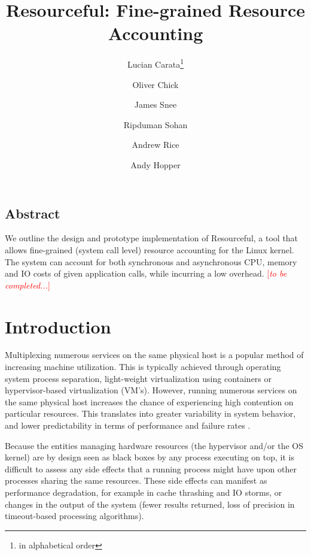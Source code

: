 \documentclass[letterpaper,twocolumn,10pt]{article}
\newcommand{\pname}{Resourceful}
\newcommand{\lnote}[1]{\textcolor{red}{[\textit{#1}]}} %
\newcommand*\aorder[1][\value{footnote}]{\footnotemark[#1]}
\begin{document}
\date{}

\title{\Large \bf \pname: Fine-grained Resource Accounting}

\author{Lucian Carata\thanks{in alphabetical order}\aorder} \author{Oliver
Chick\aorder} \author{James Snee\aorder} \author{\authorcr{}Ripduman Sohan}
\author{Andrew Rice} \author{Andy Hopper} 

\maketitle

\thispagestyle{empty}


\subsection*{Abstract} We outline the design and prototype implementation of
\pname, a tool that allows fine-grained (system call level) resource accounting
for the Linux kernel. The system can account for both synchronous and
asynchronous CPU, memory and IO costs of given application calls, while
incurring a low overhead. \lnote{to be completed...}

\section{Introduction} 
Multiplexing numerous services on the same physical host is a popular method of
increasing machine utilization. This is typically achieved through operating
system process separation, light-weight virtualization using containers or
hypervisor-based virtualization (VM's). However, running numerous services on
the same physical host increases the chance of experiencing high contention on
particular resources. This translates into greater variability in system
behavior, and lower predictability in terms of performance and failure rates
\cite{?}.

Because the entities managing hardware resources (the hypervisor and/or the OS
kernel) are by design seen as black boxes by any process executing on top, it is
difficult to assess any side effects that a running process might have upon
other processes sharing the same resources. These side effects can manifest as
performance degradation, for example in cache thrashing and IO storms, or
changes in the output of the system (fewer results returned, loss of precision
in timeout-based processing algorithms).
\end{document}
